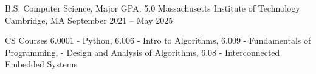 \documentclass[12pt, letterpaper]{awesome-cv}
\begin{document}
\makecvheader

\begin{cventries}
  \cventry
    {B.S. Computer Science, Major GPA: 5.0} %
    {Massachusetts Institute of Technology} %
    {Cambridge, MA} %
    {September 2021 -- May 2025} %
    {
      \vspace{-0.11in}
      \begin{cvskills}
        \cvskill
          {CS Courses} %
          {6.0001 - Python, 6.006 - Intro to Algorithms, 6.009 - Fundamentals of Programming,
           - Design and Analysis of Algorithms, 6.08 - Interconnected Embedded Systems} %
      \end{cvskills}
    }
  \vspace{-0.2in}
\end{cventries} 
\end{document}
